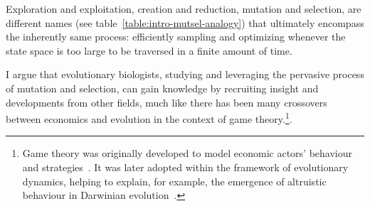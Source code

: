Exploration and exploitation, creation and reduction, mutation and selection, are different names (see table~\ref{table:intro-mutsel-analogy}) that ultimately encompass the inherently same process: efficiently sampling and optimizing whenever the state space is too large to be traversed in a finite amount of time.

\begin{table}[H]
    \centering
    \noindent{}
    \caption[Mutation, selection and drift analogy]{
    Mutation, selection and drift lexicographic rephrasing in different fields.
    }
    \label{table:intro-mutsel-analogy}
\end{table}

I argue that evolutionary biologists, studying and leveraging the pervasive process of mutation and selection, can gain knowledge by recruiting insight and developments from other fields, much like there has been many crossovers between economics and evolution in the context of game theory.\footnote{Game theory was originally developed to model economic actors' behaviour and strategies~\citep{VonNeumann1947}. It was later adopted within the framework of evolutionary dynamics, helping to explain, for example, the emergence of altruistic behaviour in Darwinian evolution~\citep{Smith1973, Smith1982, Nowak2006}.}.

